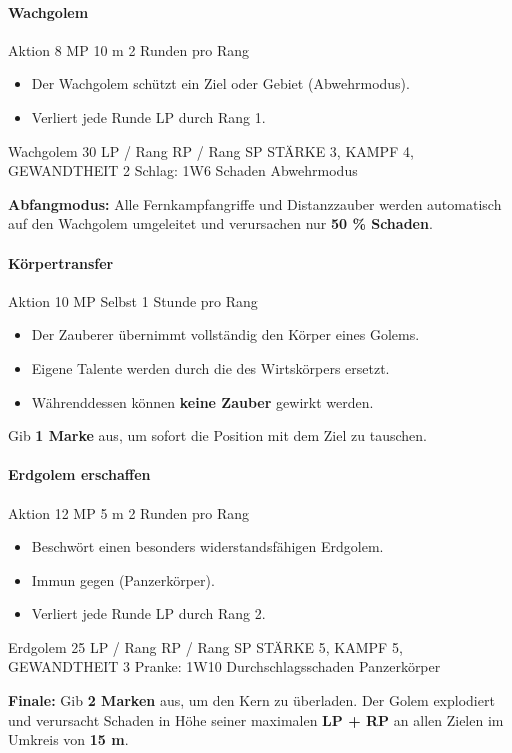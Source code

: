 \paragraph*{Wachgolem}

\spellcard
{}
{Aktion}
{8 MP}
{10 m}
{2 Runden pro Rang}
{
	\begin{itemize}
		\item Der Wachgolem schützt ein Ziel oder Gebiet (Abwehrmodus).
		\item Verliert jede Runde LP durch  Rang 1.
	\end{itemize}
	
	\medskip
	\creatureblock
	{Wachgolem}
	{30 LP / Rang RP / Rang SP}
	{STÄRKE 3, KAMPF 4, GEWANDTHEIT 2}
	{Schlag: 1W6 Schaden}
	{Abwehrmodus}
}
{
	\textbf{Abfangmodus:}
	Alle Fernkampfangriffe und Distanzzauber werden automatisch auf den Wachgolem umgeleitet
	und verursachen nur \textbf{50 \% Schaden}.
}


\paragraph*{Körpertransfer}

\spellcard
{}
{Aktion}
{10 MP}
{Selbst}
{1 Stunde pro Rang}
{
	\begin{itemize}
		\item Der Zauberer übernimmt vollständig den Körper eines Golems.
		\item Eigene Talente werden durch die des Wirtskörpers ersetzt.
		\item Währenddessen können \textbf{keine Zauber} gewirkt werden.
	\end{itemize}
}
{
	Gib \textbf{1 Marke} aus, um sofort die Position mit dem Ziel zu tauschen.
}


\paragraph*{Erdgolem erschaffen}

\spellcard
{}
{Aktion}
{12 MP}
{5 m}
{2 Runden pro Rang}
{
	\begin{itemize}
		\item Beschwört einen besonders widerstandsfähigen Erdgolem.
		\item Immun gegen  (Panzerkörper).
		\item Verliert jede Runde LP durch  Rang 2.
	\end{itemize}
	
	\medskip
	\creatureblock
	{Erdgolem}
	{25 LP / Rang RP / Rang SP}
	{STÄRKE 5, KAMPF 5, GEWANDTHEIT 3}
	{Pranke: 1W10 Durchschlagsschaden}
	{Panzerkörper}
}
{
	\textbf{Finale:}
	Gib \textbf{2 Marken} aus, um den Kern zu überladen.
	Der Golem explodiert und verursacht Schaden in Höhe seiner maximalen
	\textbf{LP + RP} an allen Zielen im Umkreis von \textbf{15 m}.
}

